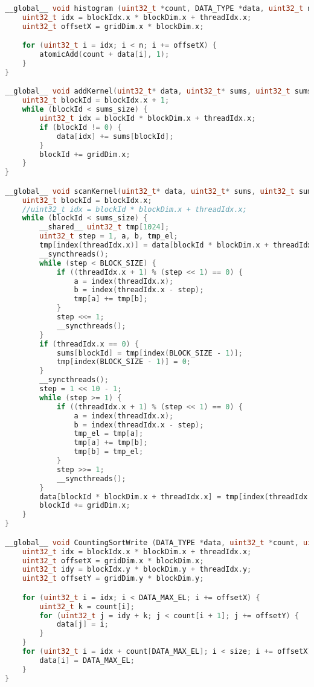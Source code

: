 \begin{lstlisting}[basicstyle=\normalfont, language=C++]
__global__ void histogram (uint32_t *count, DATA_TYPE *data, uint32_t n) {
    uint32_t idx = blockIdx.x * blockDim.x + threadIdx.x;
    uint32_t offsetX = gridDim.x * blockDim.x;

    for (uint32_t i = idx; i < n; i += offsetX) {
        atomicAdd(count + data[i], 1);
    }
}

__global__ void addKernel(uint32_t* data, uint32_t* sums, uint32_t sums_size) {
    uint32_t blockId = blockIdx.x + 1;
    while (blockId < sums_size) {
        uint32_t idx = blockId * blockDim.x + threadIdx.x;
        if (blockId != 0) {
            data[idx] += sums[blockId];
        }
        blockId += gridDim.x;
    }
}

__global__ void scanKernel(uint32_t* data, uint32_t* sums, uint32_t sums_size) {
    uint32_t blockId = blockIdx.x;
    //uint32_t idx = blockId * blockDim.x + threadIdx.x;
    while (blockId < sums_size) {
        __shared__ uint32_t tmp[1024];
        uint32_t step = 1, a, b, tmp_el;
        tmp[index(threadIdx.x)] = data[blockId * blockDim.x + threadIdx.x];
        __syncthreads();
        while (step < BLOCK_SIZE) {
            if ((threadIdx.x + 1) % (step << 1) == 0) {
                a = index(threadIdx.x);
                b = index(threadIdx.x - step);
                tmp[a] += tmp[b];
            }
            step <<= 1;
            __syncthreads();
        }
        if (threadIdx.x == 0) {
            sums[blockId] = tmp[index(BLOCK_SIZE - 1)];
            tmp[index(BLOCK_SIZE - 1)] = 0;
        }
        __syncthreads();
        step = 1 << 10 - 1;
        while (step >= 1) {
            if ((threadIdx.x + 1) % (step << 1) == 0) {
                a = index(threadIdx.x);
                b = index(threadIdx.x - step);
                tmp_el = tmp[a];
                tmp[a] += tmp[b];
                tmp[b] = tmp_el;
            }
            step >>= 1;
            __syncthreads();
        }
        data[blockId * blockDim.x + threadIdx.x] = tmp[index(threadIdx.x)];
        blockId += gridDim.x;
    }
}

__global__ void CountingSortWrite (DATA_TYPE *data, uint32_t *count, uint32_t size) {
    uint32_t idx = blockIdx.x * blockDim.x + threadIdx.x;
    uint32_t offsetX = gridDim.x * blockDim.x;
    uint32_t idy = blockIdx.y * blockDim.y + threadIdx.y;
    uint32_t offsetY = gridDim.y * blockDim.y;

    for (uint32_t i = idx; i < DATA_MAX_EL; i += offsetX) {
        uint32_t k = count[i];
        for (uint32_t j = idy + k; j < count[i + 1]; j += offsetY) {
            data[j] = i;
        }
    }
    for (uint32_t i = idx + count[DATA_MAX_EL]; i < size; i += offsetX) {
        data[i] = DATA_MAX_EL;
    }
}
\end{lstlisting}

\vspace{15pt}

